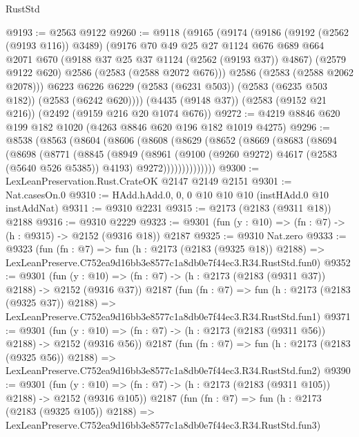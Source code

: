 \begin{lexlean}{RustStd}
\begin{coremodule}
@9193 := @2563 @9122
@9260 := @9118
    (@9165
      (@9174
        (@9186
          (@9192 (@2562 (@9193 @116)) @3489)
          (@9176
            @70
            @49
            @25
            @27
            @1124
            @676
            @689
            @664
            @2071
            @670
            (@9188 @37 @25 @37 @1124 (@2562 (@9193 @37)) @4867)
            (@2579 @9122 @620)
            @2586
            (@2583 (@2588 @2072 @676)))
          @2586
          (@2583 (@2588 @2062 @2078)))
        @6223
        @6226
        @6229
        (@2583 (@6231 @503))
        (@2583 (@6235 @503 @182))
        (@2583 (@6242 @620))))
    (@4435 (@9148 @37))
    (@2583 (@9152 @21 @216))
    (@2492 (@9159 @216 @20 @1074 @676))
@9272 := @4219 @8846 @620 @199 @182 @1020 (@4263 @8846 @620 @196 @182 @1019 @4275)
@9296 := @8538
    (@8563
      (@8604
        (@8606
          (@8608
            (@8629
              (@8652
                (@8669
                  (@8683
                    (@8694
                      (@8698
                        (@8771
                          (@8845
                            (@8949
                              (@8961
                                (@9100 (@9260 @9272) @4617 (@2583 (@5640 @526 @5385)) @4193)
                                @9272))))))))))))))
@9300 := LexLeanPreservation.Rust.CrateOK @2147 @2149 @2151
@9301 := Nat.casesOn.{0}
@9310 := HAdd.hAdd.{0, 0, 0} @10 @10 @10 (instHAdd.{0} @10 instAddNat)
@9311 := @9310 @2231
@9315 := @2173 (@2183 (@9311 @18)) @2188
@9316 := @9310 @2229
@9323 := @9301 (fun (y : @10) => (fn : @7) -> (h : @9315) -> @2152 (@9316 @18)) @2187
@9325 := @9310 Nat.zero
@9333 := @9323
    (fun (fn : @7) =>
    fun (h : @2173 (@2183 (@9325 @18)) @2188) =>
    LexLeanPreserve.C752ea9d16bb3e8577c1a8db0e7f44ec3.R34.RustStd.fun0)
@9352 := @9301
    (fun (y : @10) => (fn : @7) -> (h : @2173 (@2183 (@9311 @37)) @2188) -> @2152 (@9316 @37))
    @2187
    (fun (fn : @7) =>
    fun (h : @2173 (@2183 (@9325 @37)) @2188) =>
    LexLeanPreserve.C752ea9d16bb3e8577c1a8db0e7f44ec3.R34.RustStd.fun1)
@9371 := @9301
    (fun (y : @10) => (fn : @7) -> (h : @2173 (@2183 (@9311 @56)) @2188) -> @2152 (@9316 @56))
    @2187
    (fun (fn : @7) =>
    fun (h : @2173 (@2183 (@9325 @56)) @2188) =>
    LexLeanPreserve.C752ea9d16bb3e8577c1a8db0e7f44ec3.R34.RustStd.fun2)
@9390 := @9301
    (fun (y : @10) => (fn : @7) -> (h : @2173 (@2183 (@9311 @105)) @2188) -> @2152 (@9316 @105))
    @2187
    (fun (fn : @7) =>
    fun (h : @2173 (@2183 (@9325 @105)) @2188) =>
    LexLeanPreserve.C752ea9d16bb3e8577c1a8db0e7f44ec3.R34.RustStd.fun3)

\end{coremodule}
\end{lexlean}
